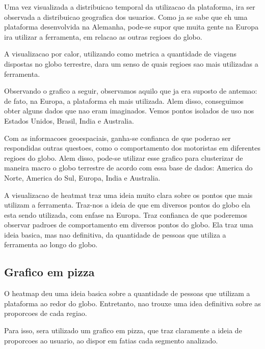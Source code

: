 \documentclass[10pt, conference]{IEEEtran}
\begin{document}
Uma vez visualizada a distribuicao temporal da utilizacao da plataforma, ira ser observada a
distribuicao geografica dos usuarios. Como ja se sabe que eh uma plataforma desenvolvida
na Alemanha, pode-se supor que muita gente na Europa ira utilizar a ferramenta, em relacao
as outras regioes do globo.

A visualizacao por calor, utilizando como metrica a quantidade de viagens dispostas no globo
terrestre, dara um senso de quais regioes sao mais utilizadas a ferramenta.

Observando o grafico a seguir, observamos aquilo que ja era suposto de antemao: de fato,
na Europa, a plataforma eh mais utilizada. Alem disso, conseguimos obter alguns dados que nao
eram imaginados. Vemos pontos isolados de uso nos Estados Unidos, Brasil, India e Australia.

Com as informacoes geoespaciais, ganha-se confianca de que poderao ser respondidas outras questoes,
como o comportamento dos motoristas em diferentes regioes do globo. Alem disso, pode-se utilizar
esse grafico para clusterizar de maneira macro o globo terrestre de acordo com essa base de 
dados: America do Norte, America do Sul, Europa, India e Australia.

A visualizacao de heatmat traz uma ideia muito clara sobre os pontos que mais utilizam a 
ferramenta. Traz-nos a ideia de que em diversos pontos do globo ela esta sendo utilizada, com
enfase na Europa. Traz confianca de que poderemos observar padroes de comportamento em diversos
pontos do globo. Ela traz uma ideia basica, mas nao definitiva, da quantidade de pessoas
que utiliza a ferramenta ao longo do globo.




\subsection{Grafico em pizza}

O heatmap deu uma ideia basica sobre a quantidade de pessoas que utilizam a plataforma ao redor
do globo. Entretanto, nao trouxe uma idea definitiva sobre as proporcoes de cada regiao.

Para isso, sera utilizado um grafico em pizza, que traz claramente a ideia de proporcoes ao
usuario, ao dispor em fatias cada segmento analizado.
\end{document}
